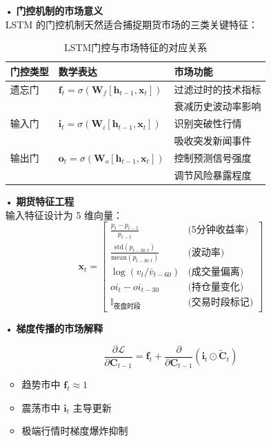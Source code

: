 \documentclass[a4paper,11pt]{ctexart}
\begin{document}
\begin{itemize}
  \item[•] \textbf{门控机制的市场意义} \\
  LSTM 的门控机制天然适合捕捉期货市场的三类关键特征：

  \begin{table}[h]
  \centering
  \caption{LSTM门控与市场特征的对应关系}
  \begin{tabular}{lll}
  \toprule
  门控类型 & 数学表达 & 市场功能 \\
  \midrule
  遗忘门 & $\mathbf{f}_t=\sigma(\mathbf{W}_f[\mathbf{h}_{t-1},\mathbf{x}_t])$ & 过滤过时的技术指标 \\
   & & 衰减历史波动率影响 \\
  输入门 & $\mathbf{i}_t=\sigma(\mathbf{W}_i[\mathbf{h}_{t-1},\mathbf{x}_t])$ & 识别突破性行情 \\
   & & 吸收突发新闻事件 \\
  输出门 & $\mathbf{o}_t=\sigma(\mathbf{W}_o[\mathbf{h}_{t-1},\mathbf{x}_t])$ & 控制预测信号强度 \\
   & & 调节风险暴露程度 \\
  \bottomrule
  \end{tabular}
  \end{table}

  \item[•] \textbf{期货特征工程} \\
  输入特征设计为 5 维向量：
  \begin{equation*}
  \mathbf{x}_t = \begin{bmatrix}
  \frac{p_t - p_{t-5}}{p_{t-5}} & \text{(5分钟收益率)} \\
  \frac{\text{std}(p_{t-30:t})}{\text{mean}(p_{t-30:t})} & \text{(波动率)} \\
  \log(v_t/\bar{v}_{t-60}) & \text{(成交量偏离)} \\
  oi_t - oi_{t-30} & \text{(持仓量变化)} \\
  \mathbb{I}_{\text{夜盘时段}} & \text{(交易时段标记)}
  \end{bmatrix}
  \end{equation*}

  \item[•] \textbf{梯度传播的市场解释}
  \begin{center}
  \begin{minipage}[t]{0.6\linewidth}
  \begin{equation*}
  \frac{\partial \mathcal{L}}{\partial \mathbf{C}_{t-1}} = \mathbf{f}_t + \frac{\partial}{\partial \mathbf{C}_{t-1}}(\mathbf{i}_t \odot \tilde{\mathbf{C}}_t)
  \end{equation*}
  \end{minipage}
  \begin{minipage}[t]{0.35\linewidth}
  \begin{itemize}
    \item 趋势市中 $\mathbf{f}_t \approx 1$
    \item 震荡市中 $\mathbf{i}_t$ 主导更新
    \item 极端行情时梯度爆炸抑制
  \end{itemize}
  \end{minipage}
  \end{center}


\end{itemize}
\end{document}
